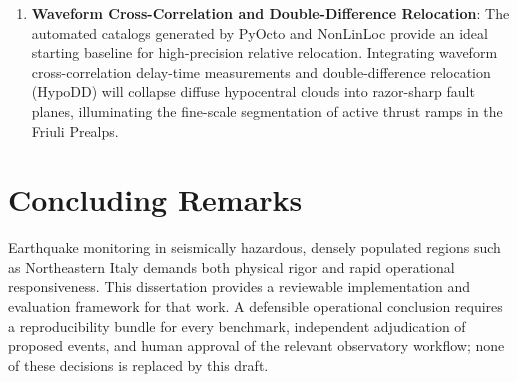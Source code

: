 \begin{enumerate}
  While our pipeline successfully picked arrival times and local magnitudes, automated earthquake source characterization requires determining fault-plane kinematics. Future work should integrate neural first-motion polarity classifiers (e.g., classifying impulsive compressional vs.\ dilatational onsets) coupled with amplitude-ratio inversion (HASH algorithm) or full-waveform regional moment tensor inversion to automatically deliver focal mechanism solutions for events with $M_{\mathrm{L}} \ge 2.5$ within minutes of origin.
  \item \textbf{Waveform Cross-Correlation and Double-Difference Relocation}:
  The automated catalogs generated by PyOcto and NonLinLoc provide an ideal starting baseline for high-precision relative relocation. Integrating waveform cross-correlation delay-time measurements and double-difference relocation (\ac{HypoDD}) will collapse diffuse hypocentral clouds into razor-sharp fault planes, illuminating the fine-scale segmentation of active thrust ramps in the Friuli Prealps.
\end{enumerate}

\section{Concluding Remarks}
\label{sec:conclusion_remarks}

Earthquake monitoring in seismically hazardous, densely populated regions such as Northeastern Italy demands both physical rigor and rapid operational responsiveness. This dissertation provides a reviewable implementation and evaluation framework for that work. A defensible operational conclusion requires a reproducibility bundle for every benchmark, independent adjudication of proposed events, and human approval of the relevant observatory workflow; none of these decisions is replaced by this draft.

